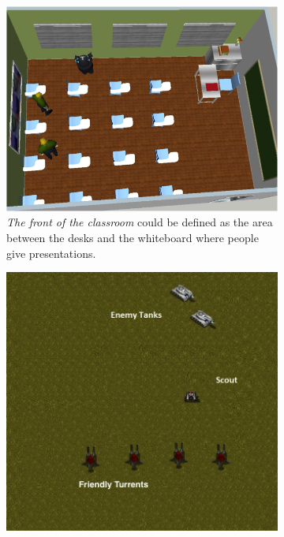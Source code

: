 \documentclass[11pt,letterpaper]{article}
\begin{document}
\begin{figure}
\centering
  \begin{subfigure}[b]{0.3\textwidth}
  \includegraphics[width=\textwidth]{figures/classroom.png}
  \caption{\textit{The front of the classroom} could be defined as the area between the desks and the whiteboard where people give presentations.}
  \end{subfigure}
\begin{subfigure}[b]{0.3\textwidth}
  \includegraphics[width=\textwidth]{figures/safety-3.jpg}

\end{subfigure}
\end{figure}
\end{document}

